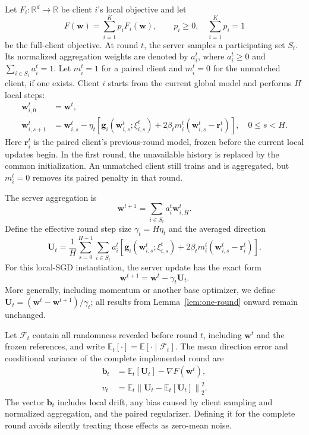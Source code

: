 \documentclass[journal,twoside,web]{ieeecolor}
\begin{document}
Let $F_i:\mathbb{R}^d\rightarrow\mathbb{R}$ be client $i$'s local objective
and let
\begin{equation}
 F(\bm w)=\sum_{i=1}^{K}p_iF_i(\bm w),
 \qquad p_i\geq0,\quad \sum_{i=1}^{K}p_i=1
\end{equation}
be the full-client objective. At round $t$, the server samples a participating
set $S_t$. Its normalized aggregation weights are denoted by $a_i^t$, where
$a_i^t\geq0$ and $\sum_{i\in S_t}a_i^t=1$. Let $m_i^t=1$ for a paired client
and $m_i^t=0$ for the unmatched client, if one exists. Client $i$ starts from
the current global model and performs $H$ local steps:
\begin{align}
 \bm w_{i,0}^{t}&=\bm w^t,\\
 \bm w_{i,s+1}^{t}
 &=\bm w_{i,s}^{t}-\eta_t\left[
 \bm g_i(\bm w_{i,s}^{t};\xi_{i,s}^{t})
 +2\beta_t m_i^t(\bm w_{i,s}^{t}-\bm r_i^t)\right],
 \quad 0\leq s<H.                                      \label{eq:local-update}
\end{align}
Here $\bm r_i^t$ is the paired client's previous-round model, frozen before
the current local updates begin. In the first round, the unavailable history
is replaced by the common initialization. An unmatched client still trains
and is aggregated, but $m_i^t=0$ removes its paired penalty in that round.

The server aggregation is
\begin{equation}
 \bm w^{t+1}=\sum_{i\in S_t}a_i^t\bm w_{i,H}^{t}.
\end{equation}
Define the effective round step size $\gamma_t=H\eta_t$ and the averaged
direction
\begin{equation}
 \bm U_t=\frac{1}{H}\sum_{s=0}^{H-1}\sum_{i\in S_t}a_i^t
 \left[\bm g_i(\bm w_{i,s}^{t};\xi_{i,s}^{t})
 +2\beta_t m_i^t(\bm w_{i,s}^{t}-\bm r_i^t)\right].      \label{eq:round-direction}
\end{equation}
For this local-SGD instantiation, the server update has the exact form
\begin{equation}
 \bm w^{t+1}=\bm w^t-\gamma_t\bm U_t.                    \label{eq:server-update}
\end{equation}
More generally, including momentum or another base optimizer, we define
$\bm U_t=(\bm w^t-\bm w^{t+1})/\gamma_t$; all results from
Lemma~\ref{lem:one-round} onward remain unchanged.

Let $\mathcal F_t$ contain all randomness revealed before round $t$, including
$\bm w^t$ and the frozen references, and write
$\mathbb E_t[\cdot]=\mathbb E[\cdot\mid\mathcal F_t]$.
The mean direction error and conditional variance of the complete implemented
round are
\begin{align}
 \bm b_t&=\mathbb E_t[\bm U_t]-\nabla F(\bm w^t),          \label{eq:bias-def}\\
 v_t&=\mathbb E_t\left\|\bm U_t-\mathbb E_t[\bm U_t]\right\|_2^2.
                                                                  \label{eq:variance-def}
\end{align}
The vector $\bm b_t$ includes local drift, any bias caused by client sampling
and normalized aggregation, and the paired regularizer. Defining it for the
complete round avoids silently treating those effects as zero-mean noise.
\end{document}
